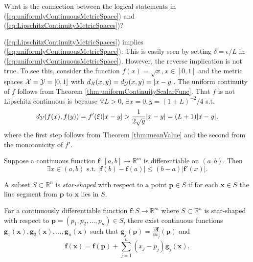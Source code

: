 \begin{exc}
  What is the connection between the logical statements
  in (\ref{eq:uniformlyContinuousMetricSpace})
  and (\ref{eq:LipschitzContinuityMetricSpaces})? 
\end{exc}
\begin{solution}
  (\ref{eq:LipschitzContinuityMetricSpaces}) implies
  (\ref{eq:uniformlyContinuousMetricSpace}):
  This is easily seen by
  setting $\delta = \epsilon / L$ in (\ref{eq:uniformlyContinuousMetricSpace}).
  However,
  the reverse implication is not true.
  To see this,
  consider the function
  $f(x) = \sqrt{x}, x\in [0, 1]$ and
  the metric spaces ${\cal X} = {\cal Y} = [0, 1]$ with
  $d_{{\cal X}}(x, y) = d_{{\cal Y}}(x, y) = |x - y|$.
  The uniform continuity of $f$ follows from
  Theorem \ref{thm:uniformContinuityScalarFunc}.
  That $f$ is not Lipschitz continuous
  is because
  $\forall L > 0$,
  $\exists x = 0, y = (1+L)^{-2}/4$
  s.t.
  \begin{equation*}
    d_{{\cal Y}}(f(x), f(y)) = f'(\xi)|x - y| > \frac{1}{2\sqrt{y}}|x - y| = (L + 1)|x - y|,
  \end{equation*}
  where the first step follows from Theorem \ref{thm:meanValue} and
  the second from the monotonicity of $f'$.
\end{solution}

\begin{thm}
  \label{thm:vectorMeanValue}
  Suppose a continuous function $\mathbf{f}: [a,b]\rightarrow \mathbb{R}^m$
  is differentiable on $(a,b)$. Then 
  \begin{equation}
    \label{eq:vectorMeanValue}
    \exists x\in(a,b) \text{ s.t. }
    |\mathbf{f}(b)-\mathbf{f}(a)|\le (b-a)|\mathbf{f}'(x)|.
  \end{equation}
\end{thm}

\begin{defn}
  \label{def:starShapedSet}
  A subset $S\subset \mathbb{R}^n$ is \emph{star-shaped} with
  respect to a point $\mathbf{p}\in S$ if for each $\mathbf{x}\in S$
  the line segment from $\mathbf{p}$ to $\mathbf{x}$ lies in $S$.
\end{defn}

\begin{thm}
  \label{thm:meanValueVectorSimilar}
  For a continuously differentiable function
  $\mathbf{f}: S\rightarrow \mathbb{R}^m$
  where $S\subset \mathbb{R}^n$
  is star-shaped with respect to $\mathbf{p}=(p_1,p_2,\ldots,p_n)\in S$, 
  there exist continuous functions
  $\mathbf{g}_1(\mathbf{x}),
  \mathbf{g}_2(\mathbf{x}), \ldots, \mathbf{g}_n(\mathbf{x})$
  such that
  $\mathbf{g}_j(\mathbf{p}) = \frac{\partial \mathbf{f}}{\partial x_j}(\mathbf{p})$
  and 
  \begin{equation}
    \label{eq:meanValueVectorSimilar}
    \mathbf{f}(\mathbf{x}) = \mathbf{f}(\mathbf{p})
    + \sum_{j=1}^n(x_j-p_j) \mathbf{g}_j(\mathbf{x}). 
  \end{equation}
\end{thm}

